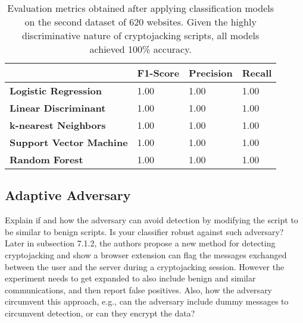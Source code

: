 \documentclass{abmart}
\newcommand{\vs}[1]{{\vspace{-#1mm}}}
\newcommand{\cj}{cryptojacking\xspace}
\begin{document}
\begin{table}[t]
\small
\begin{center}
\caption{Evaluation metrics obtained after applying classification models on the second dataset of 620 websites. Given the highly discriminative nature of \cj scripts, all models achieved 100\% accuracy. }

\begin{tabular}{llll}
                                                   & \textbf{F1-Score}         & \textbf{Precision}        & \textbf{Recall}           \\ \hline
\multicolumn{1}{l|}{\textbf{Logistic Regression}} & \multicolumn{1}{l|}{1.00} & \multicolumn{1}{l|}{1.00} & \multicolumn{1}{l}{1.00} \\ \hline
\multicolumn{1}{l|}{\textbf{Linear Discriminant}} & \multicolumn{1}{l|}{1.00} & \multicolumn{1}{l|}{1.00} & \multicolumn{1}{l}{1.00} \\ \hline
\multicolumn{1}{l|}{\textbf{k-nearest Neighbors}} & \multicolumn{1}{l|}{1.00} & \multicolumn{1}{l|}{1.00} & \multicolumn{1}{l}{1.00} \\ \hline
\multicolumn{1}{l|}{\textbf{Support Vector Machine}} & \multicolumn{1}{l|}{1.00} & \multicolumn{1}{l|}{1.00} & \multicolumn{1}{l}{1.00} \\ \hline
\multicolumn{1}{l|}{\textbf{Random Forest}} & \multicolumn{1}{l|}{1.00} & \multicolumn{1}{l|}{1.00} & \multicolumn{1}{l}{1.00} \\ \hline
\end{tabular}
\vs{0}
\label{tab:confusionmatrix_two}  
\end{center}
\end{table}

\subsection{Adaptive Adversary}

\RC Explain if and how the adversary can avoid detection by modifying the script to be similar to benign scripts. Is your classifier robust against such adversary? Later in subsection 7.1.2, the authors propose a new method for detecting cryptojacking and show a browser extension can flag the messages exchanged between the user and the server during a cryptojacking session. However the experiment needs to get expanded to also include benign and similar communications, and then report false positives. Also, how the adversary circumvent this approach, e.g., can the adversary include dummy messages to circumvent detection, or can they encrypt the data?
\end{document}
